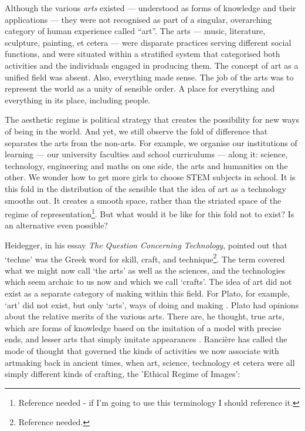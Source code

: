 \documentclass[letterpaper]{article}
\begin{document}
    Although the various \emph{arts} existed — understood as forms of knowledge and their applications — they were not recognised as part of a singular, overarching category of human experience called “art”. The arts — music, literature, sculpture, painting, et cetera — were disparate practices serving different social functions, and were situated within a stratified system that categorised both activities and the individuals engaged in producing them. The concept of art as a unified field was absent. Also, everything made sense. The job of the arts was to represent the world as a unity of sensible order. A place for everything and everything in its place, including people.
    
    The aesthetic regime is political strategy that creates the possibility for new ways of being in the world. And yet, we still observe the fold of difference that separates the arts from the non-arts. For example, we organise our institutions of learning — our university faculties and school curriculums — along it: science, technology, engineering and maths on one side, the arts and humanities on the other. We wonder how to get more girls to choose STEM subjects in school. It is this fold in the distribution of the sensible that the idea of art as a technology smooths out. It creates a smooth space, rather than the striated space of the regime of representation\footnote{Reference needed - if I'm going to use this terminology I should reference it.}. But what would it be like for this fold not to exist? Is an alternative even possible?

    Heidegger, in his essay \emph{The Question Concerning Technology}, pointed out that ‘techne’ was the Greek word for skill, craft, and technique\footnote{Reference needed.}. The term covered what we might now call ‘the arts’ as well as the sciences, and the technologies which seem archaic to us now and which we call ‘crafts’. The idea of art did not exist as a separate category of making within this field. For Plato, for example, ‘art’ did not exist, but only ‘arts’, ways of doing and making \citep[p.20]{RancierPltcsOfThAsthtcs2004}. Plato had opinions about the relative merits of the various arts. There are, he thought, true arts, which are forms of knowledge based on the imitation of a model with precise ends, and lesser arts that simply imitate appearances \citep[p.20]{RancierPltcsOfThAsthtcs2004}.  Rancière has called the mode of thought that governed the kinds of activities we now associate with artmaking back in ancient times, when art, science, technology et cetera were all simply different kinds of crafting, the ’Ethical Regime of Images’:
\end{document}
